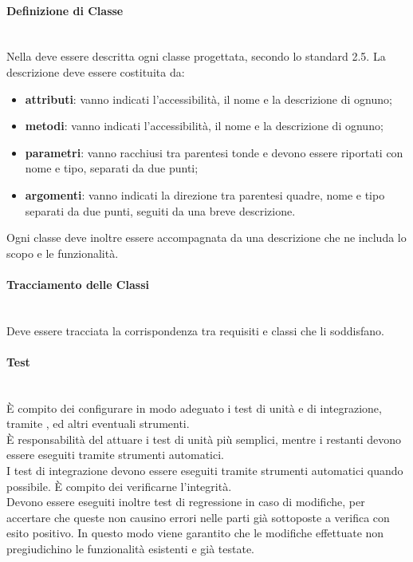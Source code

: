 \paragraph{Definizione di Classe}\mbox{}\\
Nella \DefinizioneDiProdotto{} deve essere descritta ogni classe progettata, secondo lo standard  2.5. La descrizione deve essere costituita da:
\begin{itemize}
	\item \textbf{attributi}: vanno indicati l'accessibilità, il nome e la descrizione di ognuno;
	\item \textbf{metodi}: vanno indicati l'accessibilità, il nome e la descrizione di ognuno;
	\item \textbf{parametri}: vanno racchiusi tra parentesi tonde e devono essere riportati con nome e tipo, separati da due punti;
	\item \textbf{argomenti}: vanno indicati la direzione tra parentesi quadre, nome e tipo separati da due punti, seguiti da una breve descrizione.
\end{itemize}
Ogni classe deve inoltre essere accompagnata da una descrizione che ne includa lo scopo e le funzionalità.

\paragraph{Tracciamento delle Classi}\mbox{}\\
Deve essere tracciata la corrispondenza tra requisiti e classi che li soddisfano.

\paragraph{Test}\mbox{}\\
\`{E} compito dei \Progettisti{} configurare in modo adeguato i test di unità e di integrazione, tramite ,  ed altri eventuali strumenti.\\
\`{E} responsabilità del \Programmatore{} attuare i test di unità più semplici, mentre i restanti devono essere eseguiti tramite strumenti automatici.\\
I test di integrazione devono essere eseguiti tramite strumenti automatici quando possibile. \`{E} compito dei \Verificatori{} verificarne l'integrità.\\
Devono essere eseguiti inoltre test di regressione in caso di modifiche, per accertare che queste non causino errori nelle parti già sottoposte a verifica con esito positivo. In questo modo viene garantito che le modifiche effettuate non pregiudichino le funzionalità esistenti e già testate.

